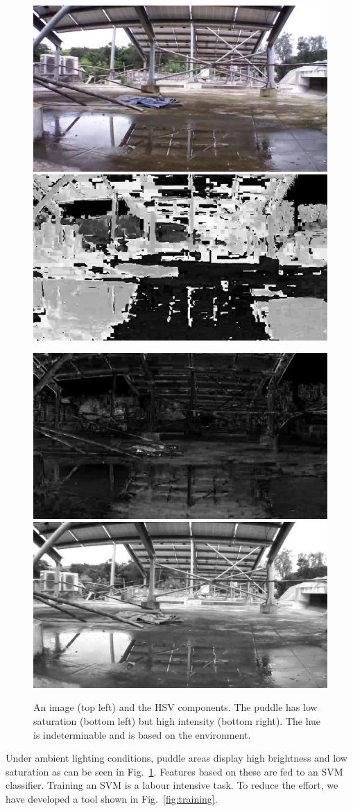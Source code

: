 \documentclass[11pt]{article}
\begin{document}
\begin{figure}[h!]
  \centering
  \includegraphics[width=0.4\linewidth]{stagnantWater/figures/IMG_PAIR_27_1}
  \hfill
  \includegraphics[width=0.4\linewidth]{stagnantWater/figures/IMG_PAIR_27_1_H} 

  \includegraphics[width=0.4\linewidth]{stagnantWater/figures/IMG_PAIR_27_1_S}
  \hfill
  \includegraphics[width=0.4\linewidth]{stagnantWater/figures/IMG_PAIR_27_1_V}
  \caption{An image (top left) and the HSV components.  The puddle has
    low saturation (bottom left) but high intensity (bottom right).
    The hue is indeterminable and is based on the environment.}
  \label{fig:HSV}
\end{figure}

Under ambient lighting conditions, puddle areas display high
brightness and low saturation as can be seen in
Fig.~\ref{fig:HSV}. Features based on these are fed to an SVM
classifier. Training an SVM is a labour intensive task.  To reduce the
effort, we have developed a tool shown in Fig.~\ref{fig:training}. 
\end{document}
